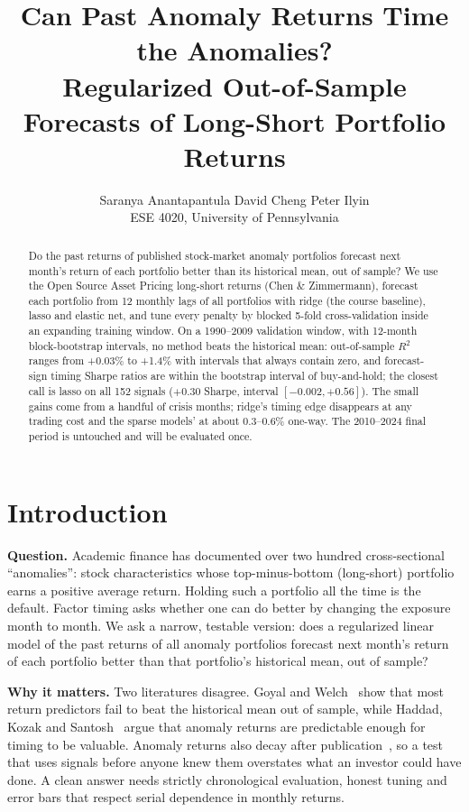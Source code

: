 \documentclass{article}
\title{Can Past Anomaly Returns Time the Anomalies?\\Regularized Out-of-Sample Forecasts of Long-Short Portfolio Returns}
\author{%
  Saranya Anantapantula \And David Cheng \And Peter Ilyin\\
  ESE 4020, University of Pennsylvania
}
\begin{document}
\maketitle

\begin{abstract}
Do the past returns of published stock-market anomaly portfolios forecast next month's return of each portfolio better than its historical mean, out of sample? We use the Open Source Asset Pricing long-short returns (Chen \& Zimmermann), forecast each portfolio from 12 monthly lags of all portfolios with ridge (the course baseline), lasso and elastic net, and tune every penalty by blocked 5-fold cross-validation inside an expanding training window. On a 1990--2009 validation window, with 12-month block-bootstrap intervals, no method beats the historical mean: out-of-sample $R^2$ ranges from +0.03\% to +1.4\% with intervals that always contain zero, and forecast-sign timing Sharpe ratios are within the bootstrap interval of buy-and-hold; the closest call is lasso on all 152 signals ($+0.30$ Sharpe, interval $[-0.002, +0.56]$). The small gains come from a handful of crisis months; ridge's timing edge disappears at any trading cost and the sparse models' at about 0.3--0.6\% one-way. The 2010--2024 final period is untouched and will be evaluated once.
\end{abstract}

\section{Introduction}
\textbf{Question.} Academic finance has documented over two hundred cross-sectional ``anomalies'': stock characteristics whose top-minus-bottom (long-short) portfolio earns a positive average return. Holding such a portfolio all the time is the default. Factor timing asks whether one can do better by changing the exposure month to month. We ask a narrow, testable version: does a regularized linear model of the past returns of all anomaly portfolios forecast next month's return of each portfolio better than that portfolio's historical mean, out of sample?

\textbf{Why it matters.} Two literatures disagree. Goyal and Welch~\cite{goyal2008} show that most return predictors fail to beat the historical mean out of sample, while Haddad, Kozak and Santosh~\cite{hks2020} argue that anomaly returns are predictable enough for timing to be valuable. Anomaly returns also decay after publication~\cite{mclean2016}, so a test that uses signals before anyone knew them overstates what an investor could have done. A clean answer needs strictly chronological evaluation, honest tuning and error bars that respect serial dependence in monthly returns.
\end{document}
